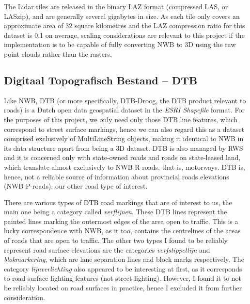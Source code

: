 The Lidar tiles are released in the binary LAZ format (compressed LAS, or LASzip), and are generally several gigabytes in size. As each tile only covers an approximate area of 32 square kilometres and the LAZ compression ratio for this dataset is 0.1 on average, scaling considerations are relevant to this project if the implementation is to be capable of fully converting NWB to 3D using the raw point clouds rather than the rasters.

\subsection{Digitaal Topografisch Bestand – DTB}
\label{sub:dtb}

Like NWB, DTB (or more specifically, DTB-Droog, the DTB product relevant to roads) is a Dutch open data geospatial dataset in the \textit{ESRI Shapefile} format. For the purposes of this project, we only need only those DTB line features, which correspond to street surface markings, hence we can also regard this as a dataset comprised exclusively of MultiLineString objects, making it identical to NWB in its data structure apart from being a 3D dataset. DTB is also managed by RWS and it is concerned only with state-owned roads and roads on state-leased land, which translate almost exclusively to NWB R-roads, that is, motorways. DTB is, hence, not a reliable source of information about provincial roads elevations (NWB P-roads), our other road type of interest.

There are various types of DTB road markings that are of interest to us, the main one being a category called \textit{verflijnen}. These DTB lines represent the painted lines marking the outermost edges of the area open to traffic. This is a lucky correspondence with NWB, as it too, contains the centrelines of the areas of roads that are open to traffic. The other two types I found to be reliably represent road surface elevations are the categories \textit{verfstippellijn} and \textit{blokmarkering}, which are lane separation lines and block marks respectively. The category \textit{lijnverlichting} also appeared to be interesting at first, as it corresponds to road surface lighting features (not street lighting). However, I found it to not be reliably located on road surfaces in practice, hence I excluded it from further consideration.

